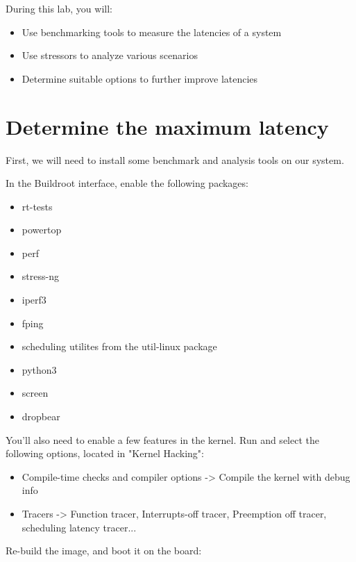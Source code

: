 
During this lab, you will:
\begin{itemize}
  \item Use benchmarking tools to measure the latencies of a system
  \item Use stressors to analyze various scenarios
  \item Determine suitable options to further improve latencies
\end{itemize}

\section{Determine the maximum latency}

First, we will need to install some benchmark and analysis tools on our system.

In the Buildroot  interface, enable the following packages:

\begin{itemize}
        \item rt-tests
        \item powertop
        \item perf
        \item stress-ng
        \item iperf3
        \item fping
        \item scheduling utilites from the util-linux package
        \item python3
        \item screen
        \item dropbear
\end{itemize}

You'll also need to enable a few features in the kernel. Run  and select
the following options, located in "Kernel Hacking":

\begin{itemize}
        \item Compile-time checks and compiler options -> Compile the kernel with debug info
        \item Tracers -> Function tracer, Interrupts-off tracer, Preemption off tracer, scheduling latency tracer...
\end{itemize}

Re-build the image, and boot it on the board: 

